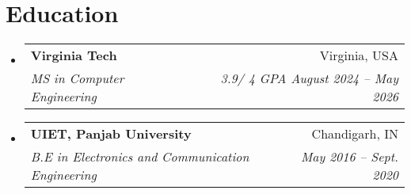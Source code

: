 \documentclass[letterpaper,11pt]{article}
\makeatletter
\newcommand{\resumeSubheading}[4]{
  \vspace{-2pt}\item
    \begin{tabular*}{0.97\textwidth}[t]{l@{\extracolsep{\fill}}r}
      \textbf{#1} & #2 \\
      \textit{\small#3} & \textit{\small #4} \\
    \end{tabular*}\vspace{-7pt}
}
\newcommand{\resumeSubHeadingListStart}{\begin{itemize}[leftmargin=0.15in, label={}]}
\newcommand{\resumeSubHeadingListEnd}{\end{itemize}}
\makeatother
\begin{document}
\section{Education}
  \resumeSubHeadingListStart
    \resumeSubheading
      {Virginia Tech}{Virginia, USA}
      {MS in Computer Engineering }{3.9/ 4 GPA August 2024 -- May 2026}

    \resumeSubheading
      {UIET, Panjab University}{Chandigarh, IN}
      {B.E in Electronics and Communication Engineering }{ May 2016 -- Sept. 2020}

  \resumeSubHeadingListEnd



\end{document}
